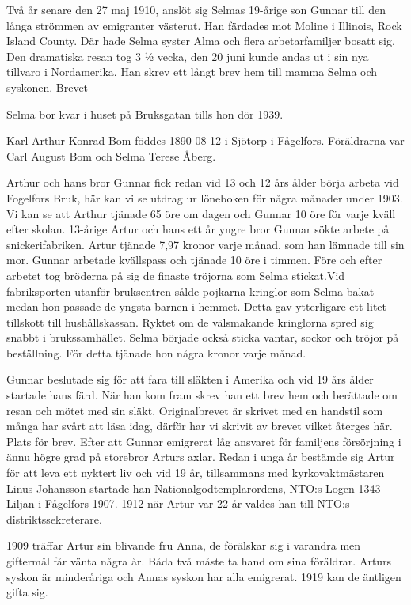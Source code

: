 Två år senare den 27 maj 1910, anslöt sig Selmas 19-årige son Gunnar till den långa strömmen av emigranter västerut. Han färdades mot Moline i Illinois, Rock Island County. Där hade Selma syster Alma och flera arbetarfamiljer bosatt sig. Den dramatiska resan tog 3 ½ vecka, den 20 juni kunde andas ut i sin nya tillvaro i Nordamerika. Han skrev ett långt brev hem till mamma Selma och syskonen.
Brevet




Selma bor kvar i huset på Bruksgatan tills hon dör 1939.


Karl Arthur Konrad Bom föddes 1890-08-12 i Sjötorp i Fågelfors. Föräldrarna var Carl August Bom och Selma Terese Åberg.
 
Arthur och hans bror Gunnar fick redan vid 13 och 12 års ålder börja arbeta vid Fogelfors Bruk, här kan vi se utdrag ur löneboken för några månader under 1903. Vi kan se att Arthur tjänade 65 öre om dagen och Gunnar 10 öre för varje kväll efter skolan.
13-årige Artur och hans ett år yngre bror Gunnar sökte arbete på snickerifabriken. Artur tjänade 7,97 kronor varje månad, som han lämnade till sin mor. Gunnar arbetade kvällspass och tjänade 10 öre i timmen. Före och efter arbetet tog bröderna på sig de finaste tröjorna som Selma stickat.Vid fabriksporten utanför bruksentren sålde pojkarna kringlor som Selma bakat medan hon passade de yngsta barnen i hemmet. Detta gav ytterligare ett litet tillskott till hushållskassan. Ryktet om de välsmakande kringlorna spred sig snabbt i brukssamhället. Selma började också sticka vantar, sockor och tröjor på beställning. För detta tjänade hon några kronor varje månad.


Gunnar beslutade sig för att fara till släkten i Amerika och vid 19 års ålder startade hans färd. När han kom fram skrev han ett brev hem och berättade om resan och mötet med sin släkt. Originalbrevet är skrivet med en handstil som många har svårt att läsa idag, därför har vi skrivit av brevet vilket återges här.
Plats för brev.
Efter att Gunnar emigrerat låg ansvaret för familjens försörjning i ännu högre grad på storebror Arturs axlar. Redan i unga år bestämde sig Artur för att leva ett nyktert liv och vid 19 år, tillsammans med kyrkovaktmästaren Linus Johansson startade han Nationalgodtemplarordens, NTO:s Logen 1343 Liljan i Fågelfors 1907.
1912 när Artur var 22 år valdes han till NTO:s distriktssekreterare. 


1909 träffar Artur sin blivande fru Anna, de förälskar sig i varandra men giftermål får vänta några år. Båda två måste ta hand om sina föräldrar. Arturs syskon är minderåriga och Annas syskon har alla emigrerat.
1919 kan de äntligen gifta sig.


